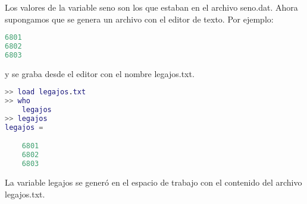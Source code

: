 Los valores de la variable seno son los que estaban en el archivo seno.dat. Ahora supongamos que se genera un archivo con el editor de texto. Por ejemplo:
\begin{lstlisting}[language=Matlab]
6801
6802
6803
\end{lstlisting}

y se graba desde el editor con el nombre legajos.txt.
\begin{lstlisting}[language=Matlab]
>> load legajos.txt
>> who
	legajos
>> legajos
legajos =

	6801
	6802
	6803
\end{lstlisting}

La variable legajos se generó en el espacio de trabajo con el contenido del archivo legajos.txt.